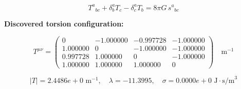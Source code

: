 
\begin{equation}
  T^a{}_{bc} + \delta^a_b T_c - \delta^a_c T_b = 8\pi G \, s^a{}_{bc}
\end{equation}

\textbf{Discovered torsion configuration:}

\begin{equation}
  T^{\mu\nu} = \begin{pmatrix}
    0 & -1.000000 & -0.997728 & -1.000000 \\
    1.000000 & 0 & -1.000000 & -1.000000 \\
    0.997728 & 1.000000 & 0 & -1.000000 \\
    1.000000 & 1.000000 & 1.000000 & 0
  \end{pmatrix} \quad \text{m}^{-1}
\end{equation}

\begin{equation}
  |T| = 2.4486e+0 \text{ m}^{-1}, \quad
  \lambda = -11.3995, \quad
  \sigma = 0.0000e+0 \text{ J}\cdot\text{s/m}^3
\end{equation}